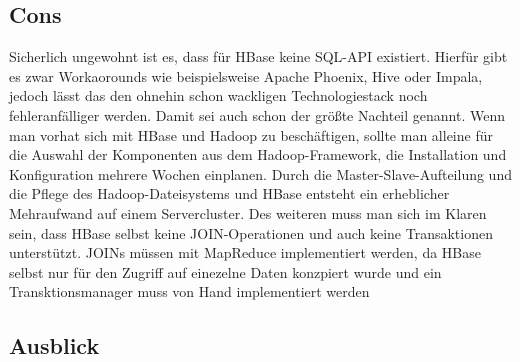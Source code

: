 \subsection{Cons}
Sicherlich ungewohnt ist es, dass für HBase keine SQL-API existiert. Hierfür gibt es zwar Workaorounds wie beispielsweise Apache Phoenix, Hive oder Impala, jedoch lässt das den ohnehin schon wackligen Technologiestack noch fehleranfälliger werden. 
Damit sei auch schon der größte Nachteil genannt. Wenn man vorhat sich mit HBase und Hadoop zu beschäftigen, sollte man alleine für die Auswahl der Komponenten aus dem Hadoop-Framework, die Installation und Konfiguration mehrere Wochen einplanen. Durch die Master-Slave-Aufteilung und die Pflege des Hadoop-Dateisystems und HBase entsteht ein erheblicher Mehraufwand auf einem Servercluster. Des weiteren muss man sich im Klaren sein, dass HBase selbst keine JOIN-Operationen und auch keine Transaktionen unterstützt. JOINs müssen mit MapReduce implementiert werden, da HBase selbst nur für den Zugriff auf einezelne Daten konzpiert wurde und ein Transktionsmanager muss von Hand implementiert werden

\subsection{Ausblick}

